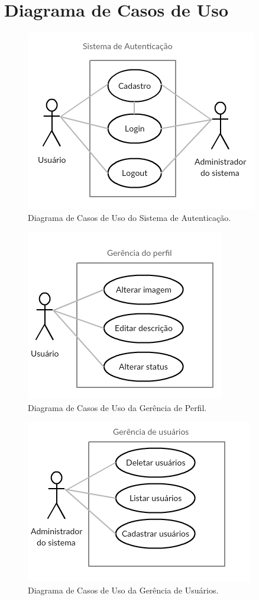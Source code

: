 \documentclass[11pt,a4paper,titlepage]{article}
\begin{document}
\pagebreak
\section{Diagrama de Casos de Uso}
\begin{figure}[!h]
	\centering
	\includegraphics[scale=0.8]{img/casosautenticacao.png}
	\caption{Diagrama de Casos de Uso do Sistema de Autenticação.}
\end{figure}
\begin{figure}[!h]
	\centering
	\includegraphics[scale=0.8]{img/casosperfil.png}
	\caption{Diagrama de Casos de Uso da Gerência de Perfil.}
\end{figure}
\begin{figure}[!h]
	\centering
	\includegraphics[scale=0.8]{img/casosusuarios.png}
	\caption{Diagrama de Casos de Uso da Gerência de Usuários.}
\end{figure}
\end{document}
